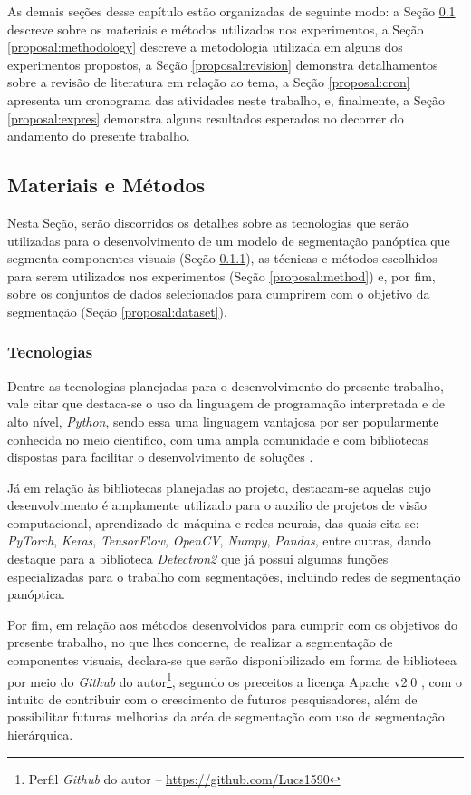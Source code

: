 As demais seções desse capítulo estão organizadas de seguinte modo: a Seção \ref{proposal:matmet} descreve sobre os materiais e métodos utilizados nos experimentos, a Seção \ref{proposal:methodology} descreve a metodologia utilizada em alguns dos experimentos propostos, a Seção \ref{proposal:revision} demonstra detalhamentos sobre a revisão de literatura em relação ao tema, a Seção \ref{proposal:cron} apresenta um cronograma das atividades neste trabalho, e, finalmente, a Seção \ref{proposal:expres} demonstra alguns resultados esperados no decorrer do andamento do presente trabalho.


\subsection{Materiais e Métodos}
\label{proposal:matmet}
Nesta Seção, serão discorridos os detalhes sobre as tecnologias que serão utilizadas para o desenvolvimento de um modelo de segmentação panóptica que segmenta componentes visuais (Seção \ref{proposal:tec}), as técnicas e métodos escolhidos para serem utilizados nos experimentos (Seção \ref{proposal:method}) e, por fim, sobre os conjuntos de dados selecionados para cumprirem com o objetivo da segmentação (Seção \ref{proposal:dataset}).


\subsubsection{Tecnologias}
\label{proposal:tec}
Dentre as tecnologias planejadas para o desenvolvimento do presente trabalho, vale citar que destaca-se o uso da linguagem de programação interpretada e de alto nível, \textit{Python}, sendo essa uma linguagem vantajosa por ser popularmente conhecida no meio cientifico, com uma ampla comunidade e com  bibliotecas dispostas para facilitar o desenvolvimento de soluções \cite{Millman2011PythonEngineers}.

Já em relação às bibliotecas planejadas ao projeto, destacam-se aquelas cujo desenvolvimento é amplamente utilizado para o auxilio de projetos de visão computacional, aprendizado de máquina e redes neurais, das quais cita-se: \textit{PyTorch}, \textit{Keras}, \textit{TensorFlow}, \textit{OpenCV}, \textit{Numpy}, \textit{Pandas}, entre outras, dando destaque para a biblioteca \textit{Detectron2} \cite{detectron2} que já possui algumas funções especializadas para o trabalho com segmentações, incluindo redes de segmentação panóptica.

Por fim, em relação aos métodos desenvolvidos para cumprir com os objetivos do presente trabalho, no que lhes concerne, de realizar a segmentação de componentes visuais, declara-se que serão disponibilizado em forma de biblioteca por meio do \textit{Github} do autor\footnote{Perfil \textit{Github} do autor – \url{https://github.com/Lucs1590}}, segundo os preceitos a licença Apache v2.0 \cite{Licenses}, com o intuito de contribuir com o crescimento de futuros pesquisadores, além de possibilitar futuras melhorias da aréa de segmentação com uso de segmentação hierárquica.



